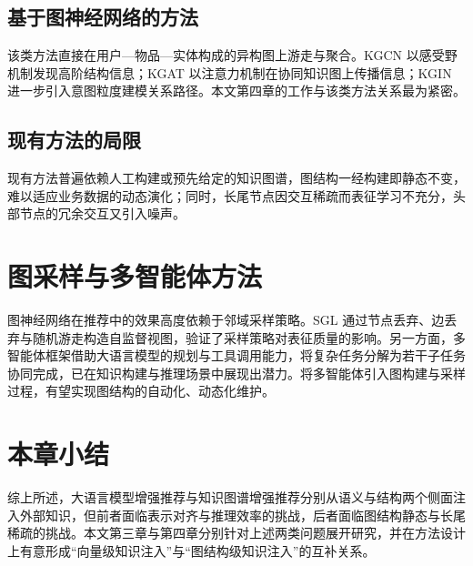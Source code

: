 \subsection{基于图神经网络的方法}
\label{subsec:kg-gnn}

该类方法直接在用户—物品—实体构成的异构图上游走与聚合。KGCN 以感受野机制发现高阶结构信息\cite{wang2019kgcn}；KGAT 以注意力机制在协同知识图上传播信息\cite{wang2019kgat}；KGIN 进一步引入意图粒度建模关系路径\cite{wang2021kgin}。本文第四章的工作与该类方法关系最为紧密。

\subsection{现有方法的局限}
\label{subsec:kg-limitation}

现有方法普遍依赖人工构建或预先给定的知识图谱，图结构一经构建即静态不变，难以适应业务数据的动态演化；同时，长尾节点因交互稀疏而表征学习不充分，头部节点的冗余交互又引入噪声。

\section{图采样与多智能体方法}
\label{sec:sampling-agent}

图神经网络在推荐中的效果高度依赖于邻域采样策略。SGL 通过节点丢弃、边丢弃与随机游走构造自监督视图\cite{wu2021sgl}，验证了采样策略对表征质量的影响。另一方面，多智能体框架借助大语言模型的规划与工具调用能力，将复杂任务分解为若干子任务协同完成，已在知识构建与推理场景中展现出潜力。将多智能体引入图构建与采样过程，有望实现图结构的自动化、动态化维护。

\section{本章小结}
\label{sec:related-summary}

综上所述，大语言模型增强推荐与知识图谱增强推荐分别从语义与结构两个侧面注入外部知识，但前者面临表示对齐与推理效率的挑战，后者面临图结构静态与长尾稀疏的挑战。本文第三章与第四章分别针对上述两类问题展开研究，并在方法设计上有意形成“向量级知识注入”与“图结构级知识注入”的互补关系。
